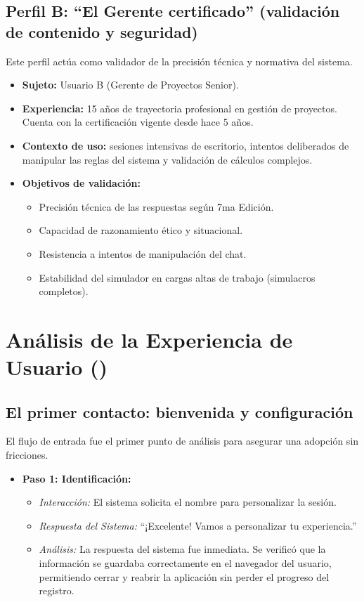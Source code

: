 \subsection{Perfil B: \enquote{El Gerente certificado} (validación de contenido y seguridad)}
Este perfil actúa como validador de la precisión técnica y normativa del sistema.
\begin{itemize}
\item   \textbf{Sujeto:} Usuario B (Gerente de Proyectos Senior).
\item   \textbf{Experiencia:} 15 años de trayectoria profesional en gestión de proyectos. Cuenta con la certificación  vigente desde hace 5 años.
\item   \textbf{Contexto de uso:} sesiones intensivas de escritorio, intentos deliberados de manipular las reglas del sistema y validación de cálculos complejos.
\item   \textbf{Objetivos de validación:}
\begin{itemize}
\item   Precisión técnica de las respuestas según  7ma Edición.
\item   Capacidad de razonamiento ético y situacional.
\item   Resistencia a intentos de manipulación del chat.
\item   Estabilidad del simulador en cargas altas de trabajo (simulacros completos).
\end{itemize}
\end{itemize}

\section{Análisis de la Experiencia de Usuario ()}

\subsection{El primer contacto: bienvenida y configuración}
El flujo de entrada fue el primer punto de análisis para asegurar una adopción sin fricciones.

\begin{itemize}
\item   \textbf{Paso 1: Identificación:}
\begin{itemize}
\item   \textit{Interacción:} El sistema solicita el nombre para personalizar la sesión.
\item   \textit{Respuesta del Sistema:} \enquote{¡Excelente! Vamos a personalizar tu experiencia.}
\item   \textit{Análisis:} La respuesta del sistema fue inmediata. Se verificó que la información se guardaba correctamente en el navegador del usuario, permitiendo cerrar y reabrir la aplicación sin perder el progreso del registro.
\end{itemize}
\end{itemize}

